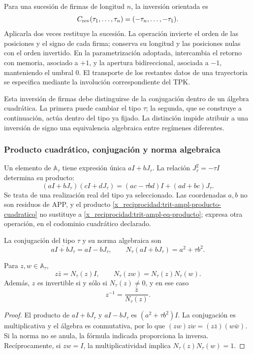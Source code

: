 Para una sucesión de firmas de longitud \(n\), la inversión orientada es
\[
 C_{\rm rev}(\tau_1,\ldots,\tau_n)
   =(-\tau_n,\ldots,-\tau_1).
\]
Aplicarla dos veces restituye la sucesión. La operación invierte el orden de
las posiciones y el signo de cada firma; conserva su longitud y las
posiciones nulas con el orden invertido. En la parametrización adoptada,
intercambia el retorno con memoria, asociado a \(+1\), y la apertura
bidireccional, asociada a \(-1\), manteniendo el umbral \(0\). El transporte
de los restantes datos de una trayectoria se especifica mediante la
involución correspondiente del TPK.

Esta inversión de firmas debe distinguirse de la conjugación dentro de un
álgebra cuadrática. La primera puede cambiar el tipo \(\tau\); la segunda,
que se construye a continuación, actúa dentro del tipo ya fijado. La
distinción impide atribuir a una inversión de signo una equivalencia
algebraica entre regímenes diferentes.

\subsubsection{Producto cuadrático, conjugación y norma algebraica}
\label{x_reciprocidad:trit-ampl-norma}

Un elemento de \(\mathbb A_\tau\) tiene expresión única \(aI+bJ_\tau\).
La relación \(J_\tau^2=-\tau I\) determina su producto:
\begin{equation}
 (aI+bJ_\tau)(cI+dJ_\tau)
   =(ac-\tau bd)I+(ad+bc)J_\tau.
 \label{x_reciprocidad:trit-ampl-producto-cuadratico}
\end{equation}
Se trata de una realización real del tipo ya seleccionado. Las coordenadas
\(a,b\) no son residuos de APP, y el producto
\eqref{x_reciprocidad:trit-ampl-producto-cuadratico} no sustituye a
\eqref{x_reciprocidad:trit-ampl-eq-producto}; expresa otra operación, en el codominio
cuadrático declarado.

\begin{definition}
\label{x_reciprocidad:trit-ampl-def-norma}
La conjugación del tipo \(\tau\) y su norma algebraica son
\[
 \overline{aI+bJ_\tau}=aI-bJ_\tau,\qquad
 N_\tau(aI+bJ_\tau)=a^2+\tau b^2.
\]
\end{definition}

\begin{proposition}
\label{x_reciprocidad:trit-ampl-prop-norma}
Para \(z,w\in\mathbb A_\tau\),
\[
 z\bar z=N_\tau(z)I,\qquad
 N_\tau(zw)=N_\tau(z)N_\tau(w).
\]
Además, \(z\) es invertible si y sólo si \(N_\tau(z)\ne0\), y en ese caso
\[
 z^{-1}=\frac{\bar z}{N_\tau(z)}.
\]
\end{proposition}
\begin{proof}
El producto de \(aI+bJ_\tau\) y \(aI-bJ_\tau\) es
\((a^2+\tau b^2)I\). La conjugación es multiplicativa y el álgebra es
conmutativa, por lo que
\((zw)\overline{zw}=(z\bar z)(w\bar w)\). Si la norma no se anula, la
fórmula indicada proporciona la inversa. Recíprocamente, si \(zw=I\), la
multiplicatividad implica \(N_\tau(z)N_\tau(w)=1\).
\end{proof}

